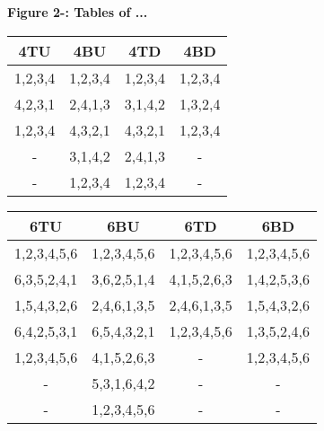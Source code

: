 \documentclass[10pt]{article}
\begin{document}
\vspace{4mm}

\begin{center}
\textbf{Figure 2-: Tables of ...}


 \begin{tabular}{||c| c| c| c||} 
 \hline
 4TU & 4BU  & 4TD & 4BD \\ [0.5ex] 
 \hline\hline
 1,2,3,4 & 1,2,3,4 & 1,2,3,4 & 1,2,3,4 \\ 
 \hline
 4,2,3,1 & 2,4,1,3 & 3,1,4,2 & 1,3,2,4 \\
 \hline
 1,2,3,4 & 4,3,2,1 & 4,3,2,1 & 1,2,3,4\\
 \hline
 - & 3,1,4,2 &  2,4,1,3 & - \\
 \hline
 - & 1,2,3,4 & 1,2,3,4 & - \\ [1ex] 
 \hline


\end{tabular}
\end{center}

\vspace{4mm}

\begin{center}
 \begin{tabular}{||c| c| c| c||} 
 \hline
 6TU & 6BU  & 6TD & 6BD \\ [0.5ex] 
 \hline\hline
 1,2,3,4,5,6 & 1,2,3,4,5,6 & 1,2,3,4,5,6 & 1,2,3,4,5,6 \\ 
 \hline
 6,3,5,2,4,1 & 3,6,2,5,1,4 & 4,1,5,2,6,3 & 1,4,2,5,3,6 \\
 \hline
 1,5,4,3,2,6 & 2,4,6,1,3,5 & 2,4,6,1,3,5 & 1,5,4,3,2,6\\
 \hline
 6,4,2,5,3,1 & 6,5,4,3,2,1 &  1,2,3,4,5,6 & 1,3,5,2,4,6 \\
 \hline
 1,2,3,4,5,6 & 4,1,5,2,6,3 & - & 1,2,3,4,5,6\\ 
 \hline
- & 5,3,1,6,4,2 & - & -\\ 
 \hline
- & 1,2,3,4,5,6 & - & -\\ [1ex] 
 \hline


\end{tabular}
\end{center}

\vspace{4mm}
\end{document}
